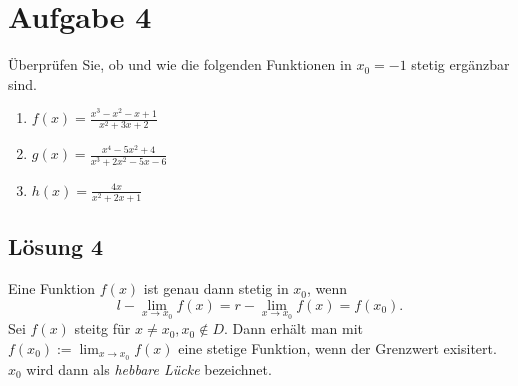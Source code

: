 \documentclass[main.tex]{subfiles}
\begin{document}
\section{Aufgabe 4}
Überprüfen Sie, ob und wie die folgenden Funktionen in $x_{0} =-1$ stetig ergänzbar sind.

\begin{enumerate}
    \item $f( x) =\frac{x^{3} -x^{2} -x+1}{x^{2} +3x+2}$
    \item $g( x) =\frac{x^{4} -5x^{2} +4}{x^{3} +2x^{2} -5x-6}$
    \item $h( x) =\frac{4x}{x^{2} +2x+1}$
\end{enumerate}

\subsection{Lösung 4}
Eine Funktion $f( x)$ ist genau dann stetig in $x_{0}$, wenn
\begin{equation*}
l-\lim _{x\rightarrow x_{0}} f( x) =r-\lim _{x\rightarrow x_{0}} f( x) =f( x_{0})\text{.}
\end{equation*}
Sei $f( x)$ steitg für $x\neq x_{0} ,x_{0} \notin D$. Dann erhält man mit $f( x_{0}) :=\lim _{x\rightarrow x_{0}} f( x)$ eine stetige Funktion, wenn der Grenzwert exisitert. $x_{0}$ wird dann als \textit{hebbare Lücke }bezeichnet.
\end{document}
